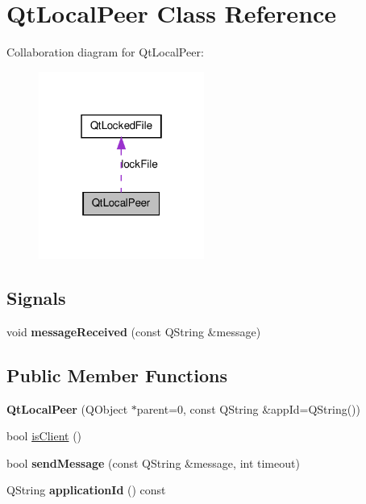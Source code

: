 \hypertarget{class_qt_local_peer}{
\section{QtLocalPeer Class Reference}
\label{class_qt_local_peer}
}


Collaboration diagram for QtLocalPeer:\nopagebreak
\begin{figure}[H]
\begin{center}
\leavevmode
\includegraphics[width=154pt]{class_qt_local_peer__coll__graph}
\end{center}
\end{figure}
\subsection*{Signals}
\begin{DoxyCompactItemize}
\item 
\hypertarget{class_qt_local_peer_a4436ad976edb6f177de1300b5aab9bfe}{
void {\bfseries messageReceived} (const QString \&message)}
\label{class_qt_local_peer_a4436ad976edb6f177de1300b5aab9bfe}

\end{DoxyCompactItemize}
\subsection*{Public Member Functions}
\begin{DoxyCompactItemize}
\item 
\hypertarget{class_qt_local_peer_a7f6f94203a6ece5b14c8c800da1e40ab}{
{\bfseries QtLocalPeer} (QObject $\ast$parent=0, const QString \&appId=QString())}
\label{class_qt_local_peer_a7f6f94203a6ece5b14c8c800da1e40ab}

\item 
bool \hyperlink{class_qt_local_peer_a72f4ec6cda404661094778f98296d2a9}{isClient} ()
\item 
\hypertarget{class_qt_local_peer_ab239cb6dcea36512d43df6ca07881ea7}{
bool {\bfseries sendMessage} (const QString \&message, int timeout)}
\label{class_qt_local_peer_ab239cb6dcea36512d43df6ca07881ea7}

\item 
\hypertarget{class_qt_local_peer_a2f7d615b1eebd738a4025894d8e213d4}{
QString {\bfseries applicationId} () const }
\label{class_qt_local_peer_a2f7d615b1eebd738a4025894d8e213d4}

\end{DoxyCompactItemize}
